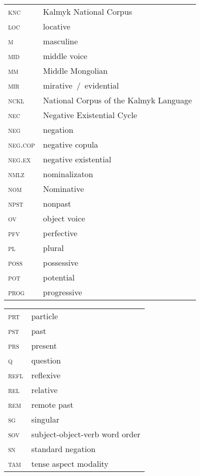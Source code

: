 \documentclass[output=paper]{langsci/langscibook}
\begin{document}
\begin{tabularx}{.45\textwidth}{lQ}
	\textsc{knc} & Kalmyk National Corpus\\
    \textsc{loc} & locative\\
    \textsc{m} & masculine\\
    \textsc{mid} & middle voice\\
    \textsc{mm} & Middle Mongolian\\
    \textsc{mir} & mirative / evidential\\
    \textsc{nckl} & National Corpus of the Kalmyk Language\\
    \textsc{nec} & Negative Existential Cycle\\
    \textsc{neg} & negation\\
    \textsc{neg.cop} & negative copula\\
    \textsc{neg.ex} & negative existential\\
    \textsc{nmlz} & nominalizaton\\
    \textsc{nom} & Nominative\\
    \textsc{npst} & nonpast\\
    \textsc{ov} & object voice\\
    \textsc{pfv} & perfective\\
    \textsc{pl} & plural\\
    \textsc{poss} & possessive\\
    \textsc{pot} & potential\\
    \textsc{prog} & progressive\\
\end{tabularx}

\newpage
\begin{tabularx}{.45\textwidth}{lQ}
    \textsc{prt} & particle\\
    \textsc{pst} & past\\
    \textsc{prs} & present\\
    \textsc{q} & question\\
    \textsc{refl} & reflexive\\
    \textsc{rel} & relative\\
    \textsc{rem} & remote past\\
    \textsc{sg} & singular\\
    \textsc{sov} & subject-object-verb word order\\
    \textsc{sn} & standard negation\\
    \textsc{tam} & tense aspect modality\\
\end{tabularx}
\end{document}

